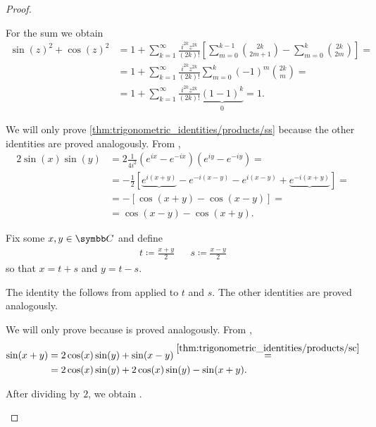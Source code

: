 \begin{proof}
\begin{description}
    For the sum we obtain
    \begin{align*}
      \sin(z)^2 + \cos(z)^2
      &=
      1 + \sum_{k=1}^\infty \frac {i^{2k} z^{2k}} {(2k)!} \left[ \sum_{m=0}^{k-1} \binom {2k} {2m+1} - \sum_{m=0}^k \binom {2k} {2m} \right]
      = \\ &=
      1 + \sum_{k=1}^\infty \frac {i^{2k} z^{2k}} {(2k)!} \sum_{m=0}^k (-1)^m \binom {2k} m
      = \\ &=
      1 + \sum_{k=1}^\infty \frac {i^{2k} z^{2k}} {(2k)!} \underbrace{(1 - 1)^k}_0
      =
      1.
    \end{align*}

     We will only prove \ref{thm:trigonometric_identities/products/ss} because the other identities are proved analogously. From ,
    \begin{align*}
      2 \sin(x) \sin(y)
      &=
      2 \frac 1 {4i^2} (e^{ix} - e^{-ix}) (e^{iy} - e^{-iy})
      = \\ &=
      - \frac 1 2 [\underbrace{e^{i(x+y)}} - e^{-i(x-y)} - e^{i(x-y)} + \underbrace{e^{-i(x+y)}}]
      = \\ &=
      - \left[\cos(x + y) - \cos(x - y)\right]
      = \\ &=
      \cos(x - y) - \cos(x + y).
    \end{align*}

     Fix some \( x, y \in \BC \) and define
    \begin{align*}
      t \coloneqq \frac {x + y} 2
      &&
      s \coloneqq \frac {x - y} 2
    \end{align*}
    so that \( x = t + s \) and \( y = t - s \).

    The identity  the follows from  applied to \( t \) and \( s \). The other identities are proved analogously.

     We will only prove  because  is proved analogously. From ,
    \begin{align*}
      \sin(x + y)
      &=
      2 \cos(x) \sin(y) + \sin(x - y)
      \overset {\ref{thm:trigonometric_identities/products/sc}} = \\ &=
      2 \cos(x) \sin(y) + 2 \cos(x) \sin(y) - \sin(x + y).
    \end{align*}

    After dividing by \( 2 \), we obtain .
  \end{description}
\end{proof}

